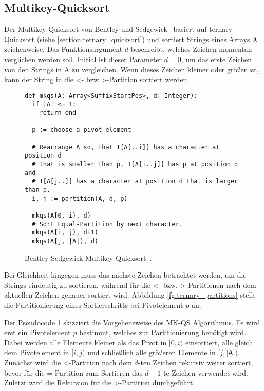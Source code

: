 \subsection{Multikey-Quicksort}
\label{section:mkqs}
Der  Multikey-Quicksort von
Bentley und Sedgewick~\cite{multikey_quicksort} basiert auf ternary Quicksort (siehe \cref{section:ternary_quicksort})
und sortiert Strings eines Arrays \textsf{A} zeichenweise.
Das Funktionsargument $d$ beschreibt, welches Zeichen momentan verglichen werden soll.
Initial ist dieser Parameter $d = 0$,
um das erste Zeichen von den Strings in \textsf{A} zu vergleichen.
Wenn dieses Zeichen kleiner oder größer ist,
kann der String in die \glqq <\grqq- bzw \glqq >\grqq-Partition sortiert werden.

\begin{figure}
	\begin{verbatim}
def mkqs(A: Array<SuffixStartPos>, d: Integer):
  if |A| <= 1:
    return end

  p := choose a pivot element

  # Rearrange A so, that T[A[..i]] has a character at position d
  # that is smaller than p, T[A[i..j]] has p at position d and 
  # T[A[j..]] has a character at position d that is larger than p.
  i, j := partition(A, d, p)

  mkqs(A[0, i), d)
  # Sort Equal-Partition by next character.
  mkqs(A[i, j), d+1)
  mkqs(A[j, |A|), d)
	\end{verbatim}
	\caption{Bentley-Sedgewick Multikey-Quicksort~\cite{multikey_quicksort}.}
	\label{alg:mkqs}
\end{figure}

Bei Gleichheit hingegen muss das nächste Zeichen betrachtet werden, um die Strings eindeutig zu sortieren,
während für die \glqq <\grqq- bzw. \glqq >\grqq-Partitionen nach dem aktuellen Zeichen genauer sortiert wird.
Abbildung \ref{fg:ternary_partitions} stellt die Partitionierung eines Sortierschritts bei Pivotelement $p$ an.

Der Pseudocode \ref{alg:mkqs} skizziert die Vorgehensweise des MK-QS Algorithmus.
Es wird erst ein Pivotelement $p$ bestimmt, welches zur Partitionierung benötigt wird.
Dabei werden alle Elemente kleiner als das Pivot in $[0, i)$ einsortiert,
alle gleich dem Pivotelement in $[i, j)$ und schließlich alle größeren Elemente in $[j, |\textsf{A}|)$.
Zunächst wird die \glqq <\grqq-Partition nach dem $d$-ten Zeichen rekursiv weiter sortiert,
bevor für die \glqq =\grqq-Partition zum Sortieren das $d+1$-te Zeichen verwendet wird.
Zuletzt wird die Rekursion für die \glqq >\grqq-Partition durchgeführt.

